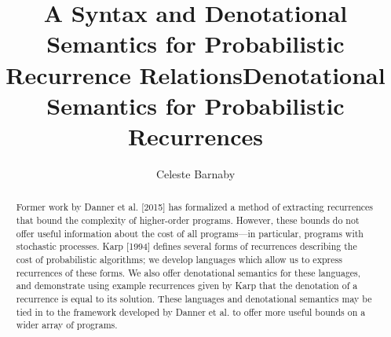 \documentclass[12pt]{westhesis}
\title{A Syntax and Denotational Semantics for Probabilistic Recurrence Relations}
\theoremstyle{plain}
\theoremstyle{definition}
\begin{document}
\begin{abstract}
Former work by Danner et al. [2015] has formalized a method of extracting recurrences that bound the complexity
of higher-order programs. However, these bounds do not offer useful information about the cost of all programs---in particular,
programs with stochastic processes. Karp [1994] defines several forms of recurrences describing the cost of probabilistic
algorithms; we develop languages which allow us to express recurrences of these forms. We also offer denotational semantics for these languages, and demonstrate using example recurrences given by Karp that the denotation of a recurrence is equal to its solution. These languages and denotational semantics may be tied in to the framework developed by Danner et al. to offer
more useful bounds on a wider array of programs.
\end{abstract}

\title{Denotational Semantics for Probabilistic Recurrences}
\author{Celeste Barnaby}

\maketitle
\makededication
\makeabstract
\tableofcontents









\end{document}

